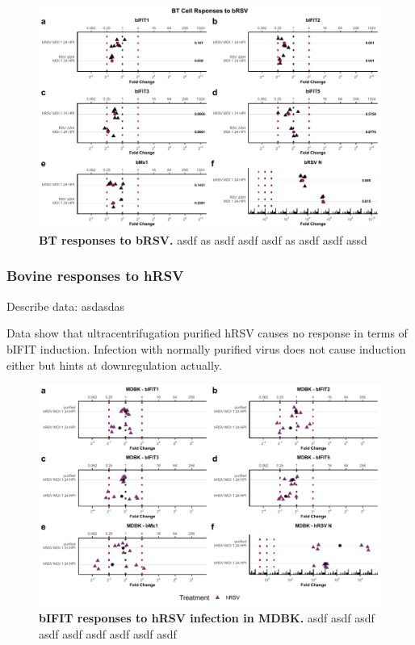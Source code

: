 \begin{figure}
    \centering
    \includegraphics[width=1\linewidth]{07. Chapter 2/Figs/02. Induction/09. bt_brsv.pdf}
    \caption[BT responses to bRSV.]{\textbf{BT responses to bRSV.} asdf as asdf asdf asdf as asdf asdf assd }
    \label{BT responses to bRSV}
\end{figure}

\subsubsection{Bovine responses to hRSV} \label{MDKB responses to hRSV}
Describe data: \newline
asdasdas

Data show that ultracentrifugation purified hRSV causes no response in terms of bIFIT induction. Infection with normally purified virus does not cause induction either but hints at downregulation actually.

\begin{figure}
    \centering
    \includegraphics[width=1\linewidth]{07. Chapter 2//Figs/07. mdbk_hrsv_plots.pdf}
    \caption[bIFIT responses to hRSV infection in MDBK.]{\textbf{bIFIT responses to hRSV infection in MDBK.} asdf asdf asdf asdf asdf asdf asdf asdf asdf }
    \label{bIFIT responses to hRSV infection in MDBK}
\end{figure}

